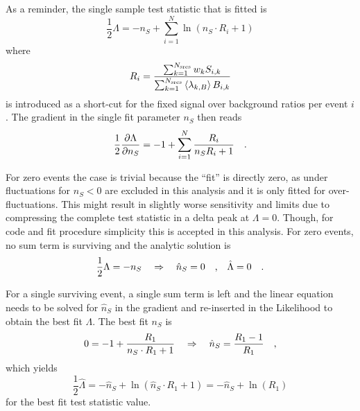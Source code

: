 As a reminder, the single sample test statistic that is fitted is
\begin{equation}
  \frac{1}{2}\Lambda = -n_S + \sum_{i=1}^N \ln\left(n_S \cdot R_i + 1\right)
\end{equation}
where
\begin{equation}
  R_i = \frac{\sum_{k=1}^{N_\text{srcs}} w_k S_{i,k}}
             {\sum_{k=1}^{N_\text{srcs}}\Braket{\lambda_{k,B}} B_{i,k}}
\end{equation}
is introduced as a short-cut for the fixed signal over background ratios per event $i$.
The gradient in the single fit parameter $n_S$ then reads
\begin{equation}
  \frac{1}{2}\frac{\partial \Lambda}{\partial n_S}
  = -1 + \sum_{i=1}^N \frac{R_i}{n_S R_i + 1}
  \quad\text{.}
\end{equation}

For zero events the case is trivial because the \enquote{fit} is directly zero, as under fluctuations for $n_S < 0$ are excluded in this analysis and it is only fitted for over-fluctuations.
This might result in slightly worse sensitivity and limits due to compressing the complete test statistic in a delta peak at $\Lambda=0$.
Though, for code and fit procedure simplicity this is accepted in this analysis. 
For zero events, no sum term is surviving and the analytic solution is
\begin{equation}
  \frac{1}{2}\Lambda
  = -n_S \quad\Rightarrow\quad \hat{n}_S = 0\quad\text{,}\quad \hat{\Lambda} = 0
  \quad\text{.}
\end{equation}

For a single surviving event, a single sum term is left and the linear equation needs to be solved for $\hat{n}_S$ in the gradient and re-inserted in the Likelihood to obtain the best fit $\Lambda$.
The best fit $n_S$ is
\begin{equation}
  0 = -1 + \frac{R_1}{n_S\cdot R_1 + 1}
    \quad\Rightarrow\quad \hat{n}_S = \frac{R_1 - 1}{R_1}
  \quad\text{,}
\end{equation}
which yields
\begin{equation}
  \frac{1}{2}\hat{\Lambda}
    = -\hat{n}_S + \ln\left( \hat{n}_S \cdot R_1 + 1 \right)
    = -\hat{n}_S + \ln(R_1)
\end{equation}
for the best fit test statistic value.

